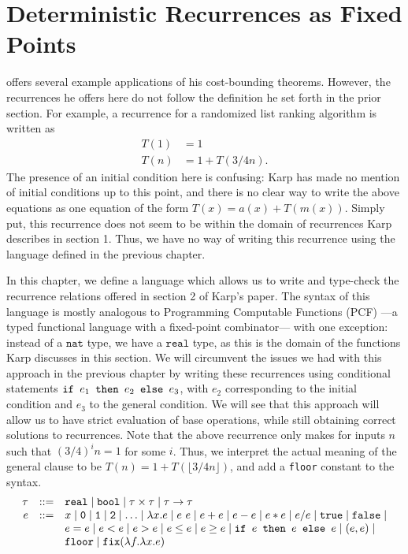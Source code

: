 \chapter{Deterministic Recurrences as Fixed Points}
\cite[\S2]{Karp} offers several example applications of his cost-bounding theorems. However, the recurrences
he offers here do not follow the definition he set forth in the prior section. For example, a recurrence for a randomized list 
ranking algorithm is written as
\begin{align*}
T(1) &= 1 \\
T(n) &= 1 + T(3/4n).
\end{align*}
The presence of an initial condition here is confusing: Karp has made no mention of initial conditions up to this point, and 
there is no clear way to write the above equations as one equation of the form $T(x) = a(x) + T(m(x))$. Simply put, 
this recurrence does not seem to be within the domain of recurrences Karp describes in section 1. Thus, we have no way
of writing this recurrence using the language defined in the previous chapter. 

In this chapter, we define a language which allows us to write and type-check the recurrence relations offered in section 2 of Karp's paper. The syntax of this language is mostly analogous to Programming Computable Functions (PCF) ---a typed functional language with a fixed-point combinator--- with one exception: instead of a 
$\texttt{nat}$ type, we have a $\texttt{real}$ type, as this is the domain of the functions Karp discusses in this section. 
We will circumvent the issues we had with this approach in the previous chapter by writing these recurrences
using conditional statements $\texttt{if } e_1 \texttt{ then } e_2 \texttt{ else } e_3$, with $e_2$ corresponding to the initial condition and $e_3$
to the general condition. We will see that this approach will allow us to have strict evaluation of base operations, while
still obtaining correct solutions to recurrences. Note that the above recurrence only makes for inputs $n$ such that
$(3/4)^in = 1$ for some $i$. Thus, we interpret the actual meaning of the general clause to be
$T(n) = 1 + T(\lfloor 3/4n \rfloor)$, and add a \texttt{floor} constant to the syntax. 
\[
\begin{array}{rcl}
\tau &::=& \texttt{real} \mid \texttt{bool} \mid \tau \times \tau \mid \tau \rightarrow \tau \\
e &::=& x  \mid \texttt{0} \mid \texttt{1} \mid \texttt{2} \mid \dotsc \mid \lambda x.e \mid e \ e \mid e + e \mid e - e \mid  e  *  e 
\mid e / e \mid \texttt{true} \mid \texttt{false} \mid \\
  && e  =  e \mid e < e \mid e > e \mid e \leq e \mid e \geq e \mid 
     \texttt{if } e \texttt{ then } e \texttt{ else } e \mid (e, e) \mid \\
     && \texttt{floor} \mid \texttt{fix} (\lambda f.\lambda x.e) 
\end{array}
\]

